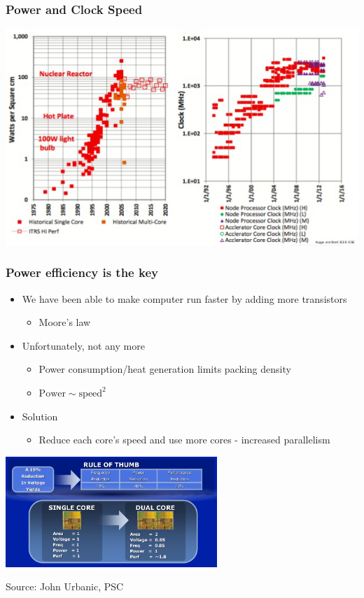 \documentclass[10pt,t]{beamer}
\begin{document}
\begin{frame}
  \frametitle{Power and Clock Speed}
  \includegraphics[width=\textwidth]{./CPUheat}
\end{frame}

\begin{frame}
  \frametitle{Power efficiency is the key}
  \begin{itemize}
  \item We have been able to make computer run faster by adding more transistors
    \begin{itemize}
    \item Moore's law
    \end{itemize}
  \item Unfortunately, not any more
    \begin{itemize}
    \item Power consumption/heat generation limits packing density
    \item $\mathrm{Power} \sim \mathrm{speed}^2$
    \end{itemize}
  \item Solution
    \begin{itemize}
    \item Reduce each core's speed and use more cores - increased
      parallelism
    \end{itemize}
  \end{itemize}
  \begin{center}
    \includegraphics[width=0.6\textwidth]{./cpucore}
    
    \tiny{Source: John Urbanic, PSC}
  \end{center}
\end{frame}
\end{document}

